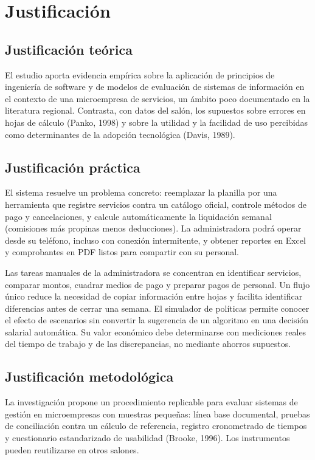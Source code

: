 \section{Justificación}\label{cap:justificacion}

\subsection{Justificación teórica}

El estudio aporta evidencia empírica sobre la aplicación de principios de ingeniería de software y de modelos de evaluación de sistemas de información en el contexto de una microempresa de servicios, un ámbito poco documentado en la literatura regional. Contrasta, con datos del salón, los supuestos sobre errores en hojas de cálculo (Panko, 1998) y sobre la utilidad y la facilidad de uso percibidas como determinantes de la adopción tecnológica (Davis, 1989).


\subsection{Justificación práctica}

El sistema resuelve un problema concreto: reemplazar la planilla por una herramienta que registre servicios contra un catálogo oficial, controle métodos de pago y cancelaciones, y calcule automáticamente la liquidación semanal (comisiones más propinas menos deducciones). La administradora podrá operar desde su teléfono, incluso con conexión intermitente, y obtener reportes en Excel y comprobantes en PDF listos para compartir con su personal.


Las tareas manuales de la administradora se concentran en identificar servicios, comparar montos, cuadrar medios de pago y preparar pagos de personal. Un flujo único reduce la necesidad de copiar información entre hojas y facilita identificar diferencias antes de cerrar una semana. El simulador de políticas permite conocer el efecto de escenarios sin convertir la sugerencia de un algoritmo en una decisión salarial automática. Su valor económico debe determinarse con mediciones reales del tiempo de trabajo y de las discrepancias, no mediante ahorros supuestos.


\subsection{Justificación metodológica}

La investigación propone un procedimiento replicable para evaluar sistemas de gestión en microempresas con muestras pequeñas: línea base documental, pruebas de conciliación contra un cálculo de referencia, registro cronometrado de tiempos y cuestionario estandarizado de usabilidad (Brooke, 1996). Los instrumentos pueden reutilizarse en otros salones.


